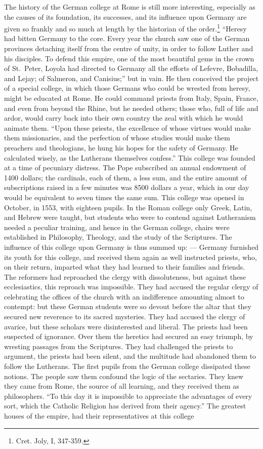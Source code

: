 \documentclass[]{book}
\let\rmarkdownfootnote\footnote%
\def\footnote{\protect\rmarkdownfootnote}
\begin{document}
The history of the German college at Rome is still more interesting, especially as the causes of its foundation, its successes, and its influence upon Germany are given so frankly and so much at length by the historian of the order.\footnote{Cret. Joly, I, 347-359.} ``Heresy had bitten Germany to the core. Every year the church saw one of the German provinces detaching itself from the centre of unity, in order to follow Luther and his disciples. To defend this empire, one of the most beautiful gems in the crown of St.~Peter, Loyola had directed to Germany all the efforts of Lefevre, Bobadilla, and Lejay; of Salmeron, and Canisius;'' but in vain. He then conceived the project of a special college, in which those Germans who could be wrested from heresy, might be educated at Rome. He could command priests from Italy, Spain, France, and even from beyond the Rhine, but he needed others; those who, full of life and ardor, would carry back into their own country the zeal with which he would animate them. ``Upon these priests, the excellence of whose virtues would make them missionaries, and the perfection of whose studies would make them preachers and theologians, he hung his hopes for the safety of Germany. He calculated wisely, as the Lutherans themselves confess.'' This college was founded at a time of pecuniary distress. The Pope subscribed an annual endowment of 1400 dollars; the cardinals, each of them, a less sum, and the entire amount of subscriptions raised in a few minutes was 8500 dollars a year, which in our day would be equivalent to seven times the same sum. This college was opened in October, in 1553, with eighteen pupils. In the Roman college only Greek, Latin, and Hebrew were taught, but students who were to contend against Lutheranism needed a peculiar training, and hence in the German college, chairs were established in Philosophy, Theology, and the study of the Scriptures. The influence of this college upon Germany is thus summed up: --- Germany furnished its youth for this college, and received them again as well instructed priests, who, on their return, imparted what they had learned to their families and friends. The reformers had reproached the clergy with dissoluteness, but against these ecclesiastics, this reproach was impossible. They had accused the regular clergy of celebrating the offices of the church with an indifference amounting almost to contempt: but these German students were so devout before the altar that they secured new reverence to its sacred mysteries. They had accused the clergy of avarice, but these scholars were disinterested and liberal. The priests had been suspected of ignorance. Over them the heretics had secured an easy triumph, by wresting passages from the Scriptures. They had challenged the priests to argument, the priests had been silent, and the multitude had abandoned them to follow the Lutherans. The first pupils from the German college dissipated these notions. The people saw them confound the logic of the sectaries. They knew they came from Rome, the source of all learning, and they received them as philosophers. ``To this day it is impossible to appreciate the advantages of every sort, which the Catholic Religion has derived from their agency.'' The greatest houses of the empire, had their representatives at this college 
\end{document}
